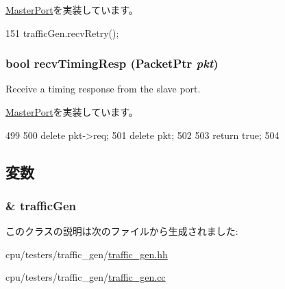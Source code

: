 \hyperlink{classMasterPort_ac1ccc3bcf7ebabb20b57fab99b2be5b0}{MasterPort}を実装しています。


\begin{DoxyCode}
151 { trafficGen.recvRetry(); }
\end{DoxyCode}
\hypertarget{classTrafficGen_1_1TrafficGenPort_a482dba5588f4bee43e498875a61e5e0b}{
\subsubsection[{recvTimingResp}]{\setlength{\rightskip}{0pt plus 5cm}bool recvTimingResp ({\bf PacketPtr} {\em pkt})}}
\label{classTrafficGen_1_1TrafficGenPort_a482dba5588f4bee43e498875a61e5e0b}
Receive a timing response from the slave port. 

\hyperlink{classMasterPort_abd323548d6c93f8b0543f1fe3a86ca35}{MasterPort}を実装しています。


\begin{DoxyCode}
499 {
500     delete pkt->req;
501     delete pkt;
502 
503     return true;
504 }
\end{DoxyCode}


\subsection{変数}
\hypertarget{classTrafficGen_1_1TrafficGenPort_a72cdb30049923a138c71a3b20b6016ba}{
\subsubsection[{trafficGen}]{\& {\bf trafficGen}}}
\label{classTrafficGen_1_1TrafficGenPort_a72cdb30049923a138c71a3b20b6016ba}


このクラスの説明は次のファイルから生成されました:\begin{DoxyCompactItemize}
\item 
cpu/testers/traffic\_\-gen/\hyperlink{traffic__gen_8hh}{traffic\_\-gen.hh}\item 
cpu/testers/traffic\_\-gen/\hyperlink{traffic__gen_8cc}{traffic\_\-gen.cc}\end{DoxyCompactItemize}
